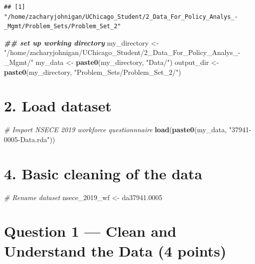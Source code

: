 \documentclass[
]{article}
\newenvironment{Shaded}{\begin{snugshade}}{\end{snugshade}}
\newcommand{\CommentTok}[1]{\textcolor[rgb]{0.56,0.35,0.01}{\textit{#1}}}
\newcommand{\DocumentationTok}[1]{\textcolor[rgb]{0.56,0.35,0.01}{\textbf{\textit{#1}}}}
\newcommand{\FloatTok}[1]{\textcolor[rgb]{0.00,0.00,0.81}{#1}}
\newcommand{\FunctionTok}[1]{\textcolor[rgb]{0.13,0.29,0.53}{\textbf{#1}}}
\newcommand{\NormalTok}[1]{#1}
\newcommand{\OtherTok}[1]{\textcolor[rgb]{0.56,0.35,0.01}{#1}}
\newcommand{\StringTok}[1]{\textcolor[rgb]{0.31,0.60,0.02}{#1}}
\begin{document}
\begin{verbatim}
## [1] "/home/zacharyjohnigan/UChicago_Student/2_Data_For_Policy_Analys_-_Mgmt/Problem_Sets/Problem_Set_2"
\end{verbatim}

\begin{Shaded}
\begin{Highlighting}[]
\DocumentationTok{\#\# set up working directory}
\NormalTok{my\_directory   }\OtherTok{\textless{}{-}} \StringTok{"/home/zacharyjohnigan/UChicago\_Student/2\_Data\_For\_Policy\_Analys\_{-}\_Mgmt/"}
\NormalTok{my\_data        }\OtherTok{\textless{}{-}} \FunctionTok{paste0}\NormalTok{(my\_directory, }\StringTok{"Data/"}\NormalTok{)}
\NormalTok{output\_dir     }\OtherTok{\textless{}{-}} \FunctionTok{paste0}\NormalTok{(my\_directory, }\StringTok{"Problem\_Sets/Problem\_Set\_2/"}\NormalTok{)}
\end{Highlighting}
\end{Shaded}

\section{2. Load dataset}\label{load-dataset}

\begin{Shaded}
\begin{Highlighting}[]
\CommentTok{\# Import NSECE 2019 workforce questionnnaire}
\FunctionTok{load}\NormalTok{(}\FunctionTok{paste0}\NormalTok{(my\_data, }\StringTok{"37941{-}0005{-}Data.rda"}\NormalTok{))}
\end{Highlighting}
\end{Shaded}

\section{4. Basic cleaning of the
data}\label{basic-cleaning-of-the-data}

\begin{Shaded}
\begin{Highlighting}[]
\CommentTok{\# Rename dataset}
\NormalTok{nsece\_2019\_wf }\OtherTok{\textless{}{-}}\NormalTok{ da37941}\FloatTok{.0005}
\end{Highlighting}
\end{Shaded}

\newpage

\section{Question 1 --- Clean and Understand the Data (4
points)}\label{question-1-clean-and-understand-the-data-4-points}
\end{document}
